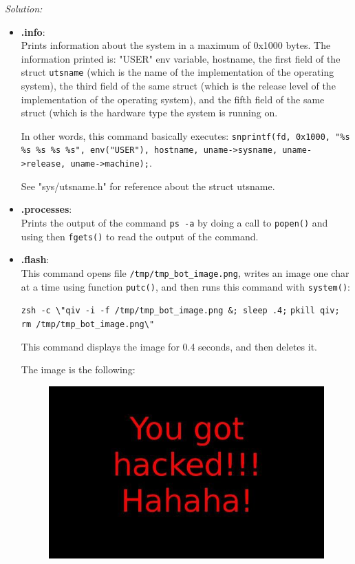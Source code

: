 \documentclass[a4paper,11pt]{article}
\newenvironment{solution}%
{\par{\noindent\small\textit{Solution:}}\vspace{-12pt}\begin{framed}}%
{\end{framed}\par}
\begin{document}
\ifsolution
\begin{solution}
	\begin{itemize}
		\item \textbf{.info}:\\
			Prints information about the system in a maximum of 0x1000 bytes. The information
			printed is: "USER" env variable, hostname, the first field of the struct \texttt{utsname} (which is 
			the name of the implementation of the operating system), the third field of the same struct (which is
			the release level of the implementation of the operating system), and the fifth field of the same
			struct (which is the hardware type the system is running on. 

			In other words, this command basically executes:
			\texttt{snprintf(fd, 0x1000, "\%s \%s \%s \%s \%s", env("USER"), hostname, uname->sysname, uname->release, uname->machine);}.

			See "sys/utsname.h" for reference about the struct utsname.

		\item \textbf{.processes}:\\
			Prints the output of the command \texttt{ps -a} by doing a call to 
			\texttt{popen()} and using then \texttt{fgets()} to read the output of the command.

		\item \textbf{.flash}:\\
			This command opens file \texttt{/tmp/tmp\_bot\_image.png}, writes an image one char at a time 
			using function \texttt{putc()}, and then runs this command with \texttt{system()}:

			\verb|zsh -c \"qiv -i -f /tmp/tmp_bot_image.png &; sleep .4;|
			\verb|pkill qiv; rm /tmp/tmp_bot_image.png\"|

			This command displays the image for 0.4 seconds, and then deletes it.

			The image is the following:
			\begin{figure}[H]
				\centering
				\includegraphics[width=.8\linewidth]{photo.jpg}
			\end{figure}


\end{itemize}
\end{solution}
\end{document}
